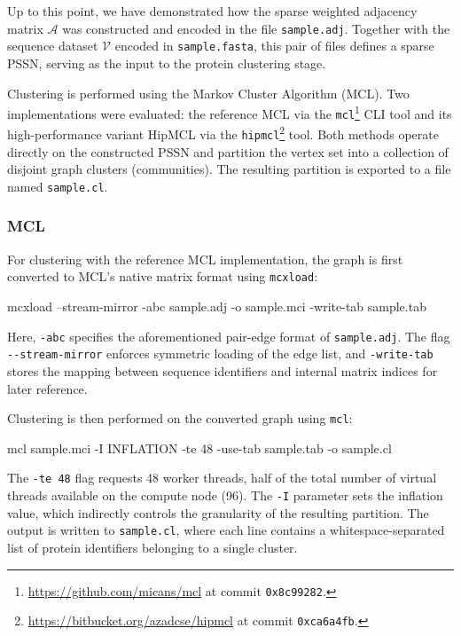 Up to this point, we have demonstrated how the sparse weighted adjacency matrix
\(\mathcal{A}\) was constructed and encoded in the file \texttt{sample.adj}.
Together with the sequence dataset \(\mathscr{V}\) encoded in
\texttt{sample.fasta}, this pair of files defines a sparse
PSSN, serving as the input to the protein clustering stage.

Clustering is performed using the Markov Cluster Algorithm (MCL). Two
implementations were evaluated: the reference MCL \cite{mcl} via the
\texttt{mcl}\footnote{\url{https://github.com/micans/mcl} at commit
\texttt{0x8c99282}.} CLI tool and its high-performance variant HipMCL \cite{hipmcl}
via the \texttt{hipmcl}\footnote{\url{https://bitbucket.org/azadcse/hipmcl} at
commit \texttt{0xca6a4fb}.} tool. Both methods operate directly on the
constructed PSSN and partition the vertex set into a collection of disjoint
graph clusters (communities). The resulting partition is exported to a file
named \texttt{sample.cl}.

\subsubsection{MCL}

For clustering with the reference MCL implementation, the graph is first converted to MCL's native matrix format using \texttt{mcxload}:

\begin{plaintext}[numbers=none]
mcxload --stream-mirror -abc sample.adj -o sample.mci -write-tab sample.tab
\end{plaintext}

Here, \texttt{-abc} specifies the aforementioned pair-edge format of
\texttt{sample.adj}. The flag \texttt{-{}-stream-mirror} enforces symmetric
loading of the edge list, and \texttt{-write-tab} stores the mapping between
sequence identifiers and internal matrix indices for later reference.

Clustering is then performed on the converted graph using \texttt{mcl}:

\begin{plaintext}[numbers=none]
mcl sample.mci -I INFLATION -te 48 -use-tab sample.tab -o sample.cl
\end{plaintext}

The \texttt{-te 48} flag requests 48 worker threads, half of the total number
of virtual threads available on the compute node (96). The \texttt{-I} parameter sets the inflation value, which indirectly controls the
granularity of the resulting partition. The output is written to
\texttt{sample.cl}, where each line contains a whitespace-separated list of
protein identifiers belonging to a single cluster.

